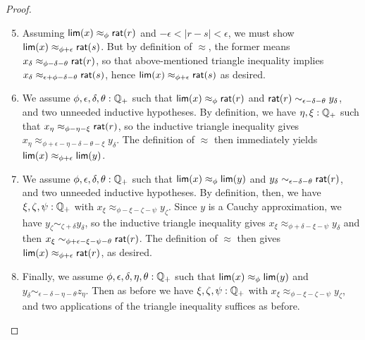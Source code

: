 \begin{proof}
  \begin{enumerate}\setcounter{enumi}{4}
  \item Assuming $\mathsf{lim}(x)\approx_\phi \mathsf{rat}(r)$ and $-\epsilon<|r-s|<\epsilon$, we must show $\mathsf{lim}(x)\approx_{\phi+\epsilon} \mathsf{rat}(s)$.
    But by definition of $\approx$, the former means $x_\delta \approx_{\phi-\delta-\theta} \mathsf{rat}(r)$, so that above-mentioned triangle inequality implies $x_\delta \approx_{\epsilon+\phi-\delta-\theta} \mathsf{rat}(s)$, hence $\mathsf{lim}(x)\approx_{\phi+\epsilon} \mathsf{rat}(s)$ as desired.
  \item We assume $\phi,\epsilon,\delta,\theta:\mathbb{Q}_{+}$ such that $\mathsf{lim}(x)\approx_\phi \mathsf{rat}(r)$ and $\mathsf{rat}(r) \sim_{\epsilon-\delta-\theta} y_\delta$, and two unneeded inductive hypotheses.
    By definition, we have $\eta,\xi:\mathbb{Q}_{+}$ such that $x_\eta \approx_{\phi-\eta-\xi} \mathsf{rat}(r)$, so the inductive triangle inequality gives $x_\eta \approx_{\phi+\epsilon-\eta-\delta-\theta-\xi} y_\delta$.
    The definition of $\approx$ then immediately yields $\mathsf{lim}(x) \approx_{\phi+\epsilon} \mathsf{lim}(y)$.
  \item We assume $\phi,\epsilon,\delta,\theta:\mathbb{Q}_{+}$ such that $\mathsf{lim}(x)\approx_\phi \mathsf{lim}(y)$ and $y_\delta \sim_{\epsilon-\delta-\theta} \mathsf{rat}(r)$, and two unneeded inductive hypotheses.
    By definition, then, we have $\xi,\zeta,\psi:\mathbb{Q}_{+}$ with $x_\xi \approx_{\phi-\xi-\zeta-\psi} y_\zeta$.
    Since $y$ is a Cauchy approximation, we have $y_\zeta \sim_{\zeta+\delta} y_\delta$, so the inductive triangle inequality gives $x_\xi \approx_{\phi+\delta-\xi-\psi} y_\delta$ and then $x_\xi \sim_{\phi+\epsilon-\xi-\psi-\theta} \mathsf{rat}(r)$.
    The definition of $\approx$ then gives $\mathsf{lim}(x) \approx_{\phi+\epsilon}\mathsf{rat}(r)$, as desired.
  \item Finally, we assume $\phi,\epsilon,\delta,\eta,\theta:\mathbb{Q}_{+}$ such that $\mathsf{lim}(x)\approx_\phi \mathsf{lim}(y)$ and $y_\delta \sim_{\epsilon-\delta-\eta-\theta} z_\eta$.
    Then as before we have $\xi,\zeta,\psi:\mathbb{Q}_{+}$ with $x_\xi \approx_{\phi-\xi-\zeta-\psi} y_\zeta$, and two applications of the triangle inequality suffices as before.
  \end{enumerate}


\end{proof}
